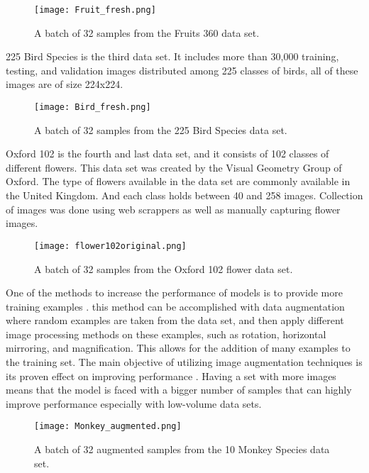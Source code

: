 \documentclass[conference]{IEEEtran}
\begin{document}
\begin{figure}
  \centering
  \texttt{[image: Fruit\_fresh.png]}
  \caption{A batch of 32 samples from the Fruits 360 data set.}
  \label{Fruits_N}
\end{figure}

225 Bird Species\cite{gerry2020bird} is the third data set. It includes more than 30,000 training, testing, and validation images distributed among 225 classes of birds, all of these images are of size 224x224.

\begin{figure}
  \centering
  \texttt{[image: Bird\_fresh.png]}
  \caption{A batch of 32 samples from the 225 Bird Species data set.}
  \label{Bird_N}
\end{figure}

Oxford 102\cite{Nilsback08} is the fourth and last data set, and it consists of 102 classes of different flowers. This data set was created by the Visual Geometry Group of Oxford. The type of flowers available in the data set are commonly available in the United Kingdom. And each class holds between 40 and 258 images. Collection of images was done using web scrappers as well as manually capturing flower images.

\begin{figure}
  \centering
  \texttt{[image: flower102original.png]}
  \caption{A batch of 32 samples from the Oxford 102 flower data set.}
  \label{Flower_N}
\end{figure}

One of the methods to increase the performance of models is to provide more training examples \cite{qazani2020new, pedrammehr2018novel}. this method can be accomplished with data augmentation where random examples are taken from the data set, and then apply different image processing methods on these examples, such as rotation, horizontal mirroring, and magnification. This allows for the addition of many examples to the training set. The main objective of utilizing image augmentation techniques is its proven effect on improving performance \cite{qazani2019high, qazani2019linear}. Having a set with more images means that the model is faced with a bigger number of samples that can highly improve performance especially with low-volume data sets.

\begin{figure}
  \centering
  \texttt{[image: Monkey\_augmented.png]}
  \caption{A batch of 32 augmented samples from the 10 Monkey Species data set.}
  \label{Mon_A_A}
\end{figure}
\end{document}
